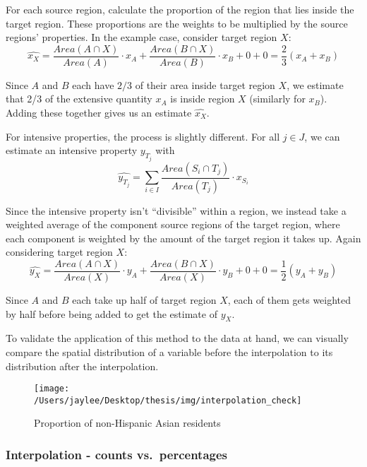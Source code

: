 \documentclass[12pt,twoside]{reedthesis}
\begin{document}
For each source region, calculate the proportion of the region that lies inside the target region. These proportions are the weights to be multiplied by the source regions' properties. In the example case, consider target region \(X\):
\[
\widehat{x_X} = \frac{Area(A \cap X)}{Area(A)} \cdot x_{A} + \frac{Area(B \cap X)}{Area(B)} \cdot x_{B} + 0 + 0 = \frac{2}{3}(x_A + x_B)
\]

Since \(A\) and \(B\) each have \(2/3\) of their area inside target region \(X\), we estimate that 2/3 of the extensive quantity \(x_A\) is inside region \(X\) (similarly for \(x_B\)). Adding these together gives us an estimate \(\widehat{x_X}\).

For intensive properties, the process is slightly different. For all \(j \in J\), we can estimate an intensive property \(y_{T_j}\) with
\[
\widehat{y_{T_j}} = \sum_{i \in I} \frac{Area(S_i \cap T_j)}{Area(T_j)} \cdot x_{S_i}
\]

Since the intensive property isn't ``divisible'' within a region, we instead take a weighted average of the component source regions of the target region, where each component is weighted by the amount of the target region it takes up. Again considering target region \(X\):
\[
\widehat{y_X} = \frac{Area(A \cap X)}{Area(X)} \cdot y_{A} + \frac{Area(B \cap X)}{Area(X)} \cdot y_{B} + 0 + 0 = \frac{1}{2}(y_A + y_B)
\]

Since \(A\) and \(B\) each take up half of target region \(X\), each of them gets weighted by half before being added to get the estimate of \(y_X\).

To validate the application of this method to the data at hand, we can visually compare the spatial distribution of a variable before the interpolation to its distribution after the interpolation.
\begin{figure}
\texttt{[image: /Users/jaylee/Desktop/thesis/img/interpolation\_check]} \caption{Proportion of non-Hispanic Asian residents}\label{fig:unnamed-chunk-4}
\end{figure}
\hypertarget{interpolation---counts-vs.-percentages}{%
\subsubsection{Interpolation - counts vs.~percentages}\label{interpolation---counts-vs.-percentages}}
\end{document}
